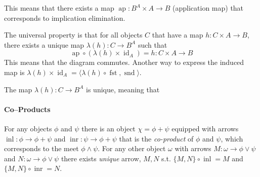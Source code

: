 This means that there exists a map $\operatorname{ap}:B^A\times A\to B$ (application map) that corresponds to implication elimination.

The universal property is that for all objects $C$ that have a map $h:C\times A\to B$, there exists a unique map $\lambda(h):C\to B^A$ such that
\[
\operatorname{ap}\circ (\lambda(h)\times \operatorname{id}_A )=h:C\times A\to B
\]
This means that the diagram commutes. Another way to express the induced map is $\lambda(h)\times \operatorname{id}_A = \langle \lambda(h)\circ\operatorname{fst},\operatorname{snd}\rangle$.

The map $\lambda(h):C\to B^A$ is unique, meaning that
\begin{mathpar}
\end{mathpar}

\paragraph{Co--Products}
For any objects $\phi$ and $\psi$ there is an object $\chi=\phi + \psi$ equipped with arrows $\operatorname{inl}:\phi\to\phi+\psi$ and $\operatorname{inr}:\psi\to\phi+\psi$ that is the \emph{co-product} of $\phi$ and $\psi$, which corresponds to the meet $\phi\wedge \psi$. For any other object $\omega$ with arrows $M:\omega\to\phi\vee\psi$ and $N:\omega\to\phi\vee\psi$ there  exists \emph{unique} arrow, ${ M,N }$ s.t. $\{M,N\}\circ\operatorname{inl}=M$ and
$\{M,N\}\circ\operatorname{inr}=N$.

